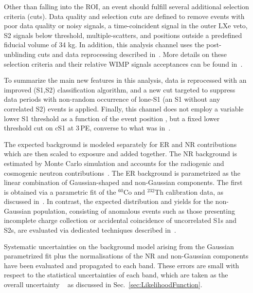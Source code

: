 Other than falling into the ROI, an event should fulfill several additional selection criteria (cuts). Data quality and selection cuts are defined to remove events with poor data quality or noisy signals, a time-coincident signal in the outer LXe veto, S2 signals below threshold, multiple-scatters, and positions outside a predefined fiducial volume of 34 kg. In addition, this analysis channel uses the post-unblinding cuts and data reprocessing described in~\cite{xe100_run_combination}. More details on these selection criteria and their relative WIMP signals acceptances can be found in~\cite{Aprile:2012vw,xe100_run_combination}. 


To summarize the main new features in this analysis, data is reprocessed with an improved (S1,S2) classification algorithm, and a new cut targeted to suppress data periods with non-random occurrence of lone-S1 (an S1 without 
any correlated S2) events is applied. 
Finally, this channel does not employ a variable lower S1 threshold as a function of the event position , but a fixed 
lower threshold cut on cS1 at 3\,PE, converse to what was  in~\cite{xe100_run_combination}.

The expected background is modeled separately for ER and NR contributions which are then scaled to exposure and added together.
The NR background is estimated by Monte Carlo simulation and accounts for the radiogenic and cosmogenic neutron
contributions~\cite{Aprile:2013tov}.
The ER background is parametrized as the linear combination of Gaussian-shaped and non-Gaussian components.
The first is obtained via a parametric fit of the $^{60}$Co and $^{232}$Th calibration data, as discussed in~\cite{xe100_run10_si}.
In contrast, the expected distribution and yields for the non-Gaussian population, consisting of anomalous events such as those 
presenting incomplete charge collection or accidental coincidence of uncorrelated S1s and S2s,  
are evaluated via dedicated techniques described in~\cite{xe100_run_combination}.

Systematic uncertainties on the background model arising from the Gaussian parametrized fit plus the normalisations of the NR and non-Gaussian components have been evaluated and propagated to each band. These errors are small with respect to the statistical uncertainties of each band, which are taken as the overall uncertainty ~\cite{xe100_run_combination} as discussed in Sec.~\ref{sec:LikelihoodFunction}.


